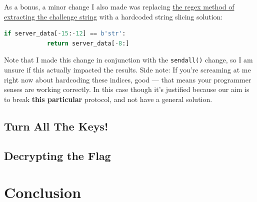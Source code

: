 \documentclass[11pt]{article}
\begin{document}
    \bigskip

    As a bonus, a minor change I also made was replacing \hyperref[lst:regex-extract]{the regex method of extracting the challenge string} with a hardcoded string slicing solution:

    \begin{lstlisting}[gobble=8,label={lst:regex-efficiency},language=Python]
        if server_data[-15:-12] == b'str':
            return server_data[-8:]
    \end{lstlisting}

    Note that I made this change in conjunction with the \verb`sendall()` change, so I am unsure if this actually impacted the results. Side note: If you're screaming at me right now about hardcoding these indices, good --- that means your programmer senses are working correctly. In this case though it's justified because our aim is to break \textbf{this particular} protocol, and not have a general solution.

    \subsection{Turn All The Keys!}\label{subsec:turn-all-the-keys}

    \subsection{Decrypting the Flag}\label{subsec:decrypting-the-flag}





    \section{Conclusion}\label{sec:conclusion}

    \pagebreak

    \appendix
\end{document}
